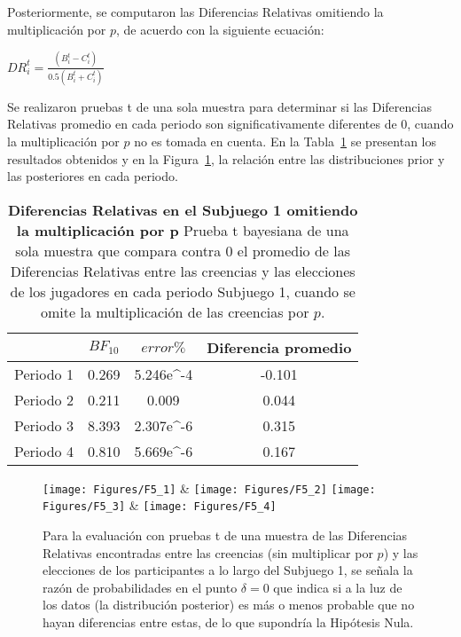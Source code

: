 Posteriormente, se computaron las Diferencias Relativas omitiendo la multiplicación por $p$, de acuerdo con la siguiente ecuación:\\

\begin{center}
$DR_i^t=  \frac{(B_i^t- C_i^t)}{0.5(B_i^t+ C_i^t)}$
\end{center}

Se realizaron pruebas t de una sola muestra para determinar si las Diferencias Relativas promedio en cada periodo son significativamente diferentes de 0, cuando la multiplicación por $p$ no es tomada en cuenta. En la Tabla~\ref{DRnop-S1-B} se presentan los resultados obtenidos y en la Figura~\ref{fig:DRnop_S1}, la relación entre las distribuciones prior y las posteriores en cada periodo.\\


\begin{table}[h]
\caption[Diferencias Relativas en el Subjuego 1, omitiendo la multiplicación por $p$ (prueba t de una muestra)]{\textbf{Diferencias Relativas en el Subjuego 1 omitiendo la multiplicación por p} Prueba t bayesiana de una sola muestra que compara contra 0 el promedio de las Diferencias Relativas entre las creencias y las elecciones de los jugadores en cada periodo Subjuego 1, cuando se omite la multiplicación de las creencias por $p$.}
\label{DRnop-S1-B}
\centering
\begin{tabular}{l | c c | c}
\toprule
\textbf{} & \textbf{$BF_{10}$} & \textbf{$error\%$} & \textbf{Diferencia promedio}\\
\midrule
Periodo 1 & 0.269 & 5.246e^-4 & -0.101\\
Periodo 2 & 0.211 & 0.009 & 0.044\\
Periodo 3 & 8.393 & 2.307e^-6 & 0.315\\
Periodo 4 & 0.810 & 5.669e^-6 & 0.167\\
\bottomrule
\end{tabular}
\end{table}
	

\begin{figure}[h]
\centering
\texttt{[image: Figures/F5\_1]} & \texttt{[image: Figures/F5\_2]} 
\texttt{[image: Figures/F5\_3]} & \texttt{[image: Figures/F5\_4]} 
\decoRule
\caption[Diferencias Relativas entre creencias y elecciones en el Subjuego 1 sin la multiplicación por p (Factor de Bayes)]{Para la evaluación con pruebas t de una muestra de las Diferencias Relativas encontradas entre las creencias (sin multiplicar por $p$) y las elecciones de los participantes a lo largo del Subjuego 1, se señala la razón de probabilidades en el punto $\delta = 0$ que indica si a la luz de los datos (la distribución posterior) es más o menos probable que no hayan diferencias entre estas, de lo que supondría la Hipótesis Nula.}
\label{fig:DRnop_S1}
\end{figure}


